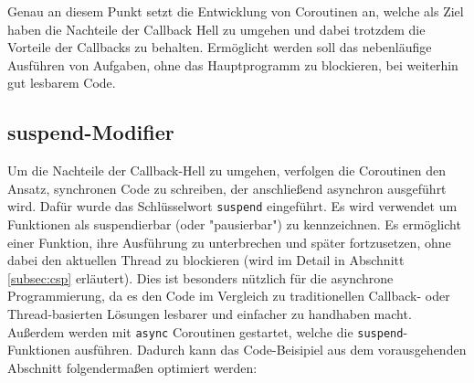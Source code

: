 \documentclass[fontsize=12pt,paper=a4,twoside=semi,parskip=half-,headsepline,headinclude]{scrreprt}
\begin{document}
Genau an diesem Punkt setzt die Entwicklung von Coroutinen an, welche als Ziel haben die Nachteile der Callback Hell zu umgehen und dabei trotzdem die Vorteile der Callbacks zu behalten\cite{Elizarov2017a}. Ermöglicht werden soll das nebenläufige Ausführen von Aufgaben, ohne das Hauptprogramm zu blockieren, bei weiterhin gut lesbarem Code.


\subsection{suspend-Modifier}
\label{subsec:suspend}

Um die Nachteile der Callback-Hell zu umgehen, verfolgen die Coroutinen den Ansatz, synchronen Code zu schreiben, der anschließend asynchron ausgeführt wird. Dafür wurde das Schlüsselwort \texttt{suspend} eingeführt\cite{Akhin2024}. Es wird verwendet um Funktionen als suspendierbar (oder "pausierbar") zu kennzeichnen. Es ermöglicht einer Funktion, ihre Ausführung zu unterbrechen und später fortzusetzen, ohne dabei den aktuellen Thread zu blockieren (wird im Detail in Abschnitt \ref{subsec:csp} erläutert). Dies ist besonders nützlich für die asynchrone Programmierung, da es den Code im Vergleich zu traditionellen Callback- oder Thread-basierten Lösungen lesbarer und einfacher zu handhaben macht. Außerdem werden mit \texttt{async} Coroutinen gestartet, welche die \texttt{suspend}-Funktionen ausführen. Dadurch kann das Code-Beisipiel aus dem vorausgehenden Abschnitt folgendermaßen optimiert werden:
\end{document}
